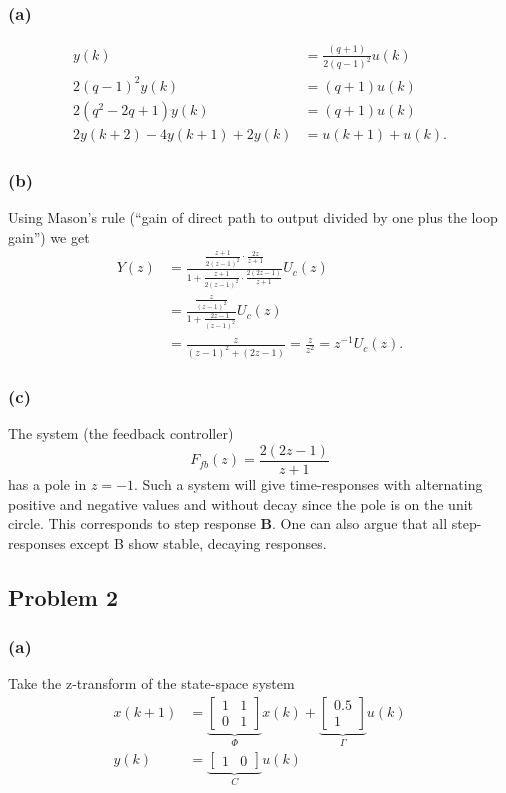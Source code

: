 \documentclass[letter,12pt]{article}
\newcommand{\bbm}{\begin{bmatrix}}
\newcommand{\ebm}{\end{bmatrix}}
\begin{document}
\subsubsection*{(a)}

\begin{equation*}
\begin{split}
 y(k) &= \frac{(q+1)}{2(q-1)^2} u(k) \\
2(q-1)^2y(k) &= (q+1)u(k)\\
2(q^2 - 2q +1)y(k) &= (q+1)u(k)\\
2y(k+2) - 4y(k+1) + 2y(k) &= u(k+1) + u(k).
\end{split}
\end{equation*}

\subsubsection*{(b)}
Using Mason's rule (``gain of direct path to output divided by one plus the loop gain'') we get
\begin{equation}
\begin{split}
Y(z) &= \frac{ \frac{z+1}{2(z-1)^2} \cdot \frac{2z}{z+1}}{ 1 + \frac{z+1}{2(z-1)^2} \cdot \frac{2(2z-1)}{z+1}}U_c(z) \\
     &= \frac{ \frac{z}{(z-1)^2}}{1 + \frac{2z-1}{(z-1)^2} }U_c(z)\\
     &= \frac{ z }{(z-1)^2 + (2z-1)} = \frac{z}{z^2} = z^{-1} U_c(z).
   \end{split}
 \end{equation}

\subsubsection*{(c)}

The system (the feedback controller) 
\[ F_{fb}(z) = \frac{2(2z-1)}{z+1}\]
has a pole in \(z=-1\). Such a system will give time-responses with alternating positive and negative values and without decay since the pole is on the unit circle. This corresponds to step response \textbf{B}. One can also argue that all step-responses except B show stable, decaying responses.

\subsection*{Problem 2}

\subsubsection*{(a)}
Take the z-transform of the state-space system 
\begin{equation}
\begin{split}
x(k+1) &= \underbrace{\bbm 1 & 1\\0 & 1\ebm}_{\Phi} x(k) + \underbrace{\bbm 0.5\\1\ebm}_{\Gamma} u(k)\\
y(k) &= \underbrace{\bbm 1 & 0 \ebm}_{C} u(k)
\end{split}
\end{equation}
\end{document}
